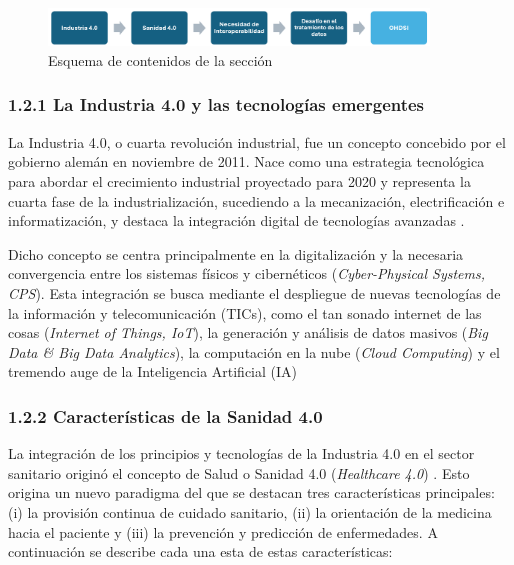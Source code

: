 \begin{figure}[H]
    \centering
    \includegraphics[width=0.90\textwidth]{figures/esquemaMarcoContextual.png}
    \caption{Esquema de contenidos de la sección}
    \label{fig:esquemaMarcoContextual}
\end{figure}


\subsubsection{1.2.1 La Industria 4.0 y las tecnologías emergentes}

La Industria 4.0, o cuarta revolución industrial, fue un concepto concebido por el gobierno alemán en noviembre de 2011. Nace como una estrategia tecnológica para abordar el crecimiento industrial proyectado para 2020 y representa la cuarta fase de la industrialización, sucediendo a la mecanización, electrificación e informatización, y destaca la integración digital de tecnologías avanzadas \cite{lasi2014industry}.

Dicho concepto se centra principalmente en la digitalización y la necesaria convergencia entre los sistemas físicos y cibernéticos (\textit{Cyber-Physical Systems, CPS}). Esta integración se busca mediante el despliegue  de nuevas tecnologías de la información y telecomunicación (TICs), como el tan sonado internet de las cosas (\textit{Internet of Things, IoT}), la generación y análisis de datos masivos (\textit{Big Data \& Big Data Analytics}), la computación en la nube (\textit{Cloud Computing}) y el tremendo auge de la Inteligencia Artificial (IA) \cite{lasi2014industry, chen2020times, tortorella2020healthcare}

\subsubsection{1.2.2 Características de la Sanidad 4.0}

La integración de los principios y tecnologías de la Industria 4.0 en el sector sanitario originó el concepto de Salud o Sanidad 4.0 (\textit{Healthcare 4.0}) \cite{tortorella2020healthcare, tortorella2021impacts}. 
Esto origina un nuevo paradigma del que se destacan tres  características principales: (i) la provisión continua de cuidado sanitario, (ii) la orientación de la medicina hacia el paciente y (iii) la prevención y predicción de enfermedades. A continuación se describe cada una esta de estas características:

